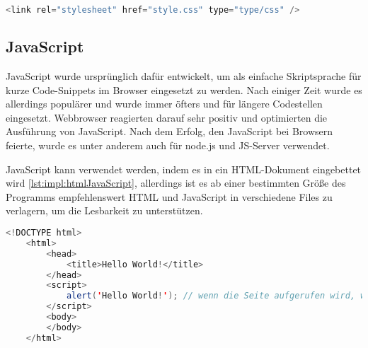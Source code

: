 \begin{lstlisting}[language=java,caption=CSS Einbettung,label=lst:impl:cssEinbettung]
    <link rel="stylesheet" href="style.css" type="type/css" />
\end{lstlisting}
 
\subsection{JavaScript}
JavaScript wurde ursprünglich dafür entwickelt, um als einfache Skriptsprache für kurze Code-Snippets im Browser eingesetzt zu werden. Nach einiger Zeit wurde es allerdings populärer und wurde immer öfters und für längere Codestellen eingesetzt. Webbrowser reagierten darauf sehr positiv und optimierten die Ausführung von JavaScript. Nach dem Erfolg, den JavaScript bei Browsern feierte, wurde es unter anderem auch für node.js und JS-Server verwendet.
 
JavaScript kann verwendet werden, indem es in ein HTML-Dokument eingebettet wird \ref{lst:impl:htmlJavaScript}, allerdings ist es ab einer bestimmten Größe des Programms empfehlenswert HTML und JavaScript in verschiedene Files zu verlagern, um die Lesbarkeit zu unterstützen.
 
\begin{lstlisting}[language=java,caption=HTML mit eingebettetem JavaScript,label=lst:impl:htmlJavaScript]
    <!DOCTYPE html>
    <html>
        <head>
            <title>Hello World!</title>
        </head>
        <script>
            alert('Hello World!'); // wenn die Seite aufgerufen wird, wird mithilfe von JavaScript ein Alert-Fenster mit 'Hello World!' ausgegeben
        </script>
        <body>
        </body>
    </html>
\end{lstlisting}